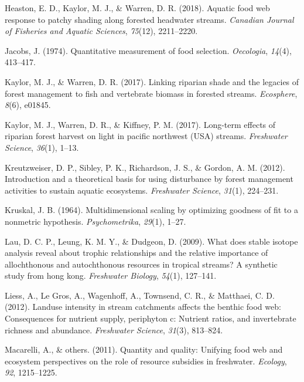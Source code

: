 \documentclass[double,12pt]{beavtex}
\begin{document}
  \hypertarget{ref-Heaston2018}{}
  Heaston, E. D., Kaylor, M. J., \& Warren, D. R. (2018). Aquatic food web
  response to patchy shading along forested headwater streams.
  \emph{Canadian Journal of Fisheries and Aquatic Sciences},
  \emph{75}(12), 2211--2220.
  
  \hypertarget{ref-Jacobs1974}{}
  Jacobs, J. (1974). Quantitative measurement of food selection.
  \emph{Oecologia}, \emph{14}(4), 413--417.
  
  \hypertarget{ref-Kaylor2017Eco}{}
  Kaylor, M. J., \& Warren, D. R. (2017). Linking riparian shade and the
  legacies of forest management to fish and vertebrate biomass in forested
  streams. \emph{Ecosphere}, \emph{8}(6), e01845.
  
  \hypertarget{ref-Kaylor2017FS}{}
  Kaylor, M. J., Warren, D. R., \& Kiffney, P. M. (2017). Long-term
  effects of riparian forest harvest on light in pacific northwest (USA)
  streams. \emph{Freshwater Science}, \emph{36}(1), 1--13.
  
  \hypertarget{ref-Kreutzweiser2012}{}
  Kreutzweiser, D. P., Sibley, P. K., Richardson, J. S., \& Gordon, A. M.
  (2012). Introduction and a theoretical basis for using disturbance by
  forest management activities to sustain aquatic ecosystems.
  \emph{Freshwater Science}, \emph{31}(1), 224--231.
  
  \hypertarget{ref-Kruskal1964}{}
  Kruskal, J. B. (1964). Multidimensional scaling by optimizing goodness
  of fit to a nonmetric hypothesis. \emph{Psychometrika}, \emph{29}(1),
  1--27.
  
  \hypertarget{ref-Lau2009}{}
  Lau, D. C. P., Leung, K. M. Y., \& Dudgeon, D. (2009). What does stable
  isotope analysis reveal about trophic relationships and the relative
  importance of allochthonous and autochthonous resources in tropical
  streams? A synthetic study from hong kong. \emph{Freshwater Biology},
  \emph{54}(1), 127--141.
  
  \hypertarget{ref-liess2012}{}
  Liess, A., Le Gros, A., Wagenhoff, A., Townsend, C. R., \& Matthaei, C.
  D. (2012). Landuse intensity in stream catchments affects the benthic
  food web: Consequences for nutrient supply, periphyton c: Nutrient
  ratios, and invertebrate richness and abundance. \emph{Freshwater
  Science}, \emph{31}(3), 813--824.
  
  \hypertarget{ref-Macarelli2011}{}
  Macarelli, A., \& others. (2011). Quantity and quality: Unifying food
  web and ecosystem perspectives on the role of resource subsidies in
  freshwater. \emph{Ecology}, \emph{92}, 1215--1225.
  
\end{document}
